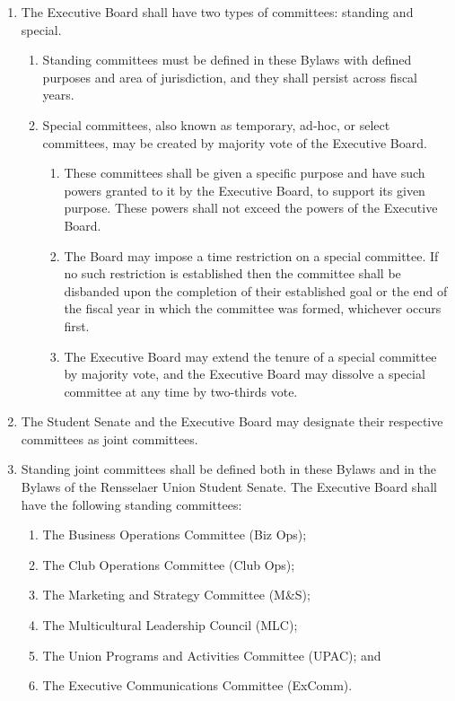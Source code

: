 \documentclass{uniondoc}
\begin{document}
\begin{enumerate}
\item The Executive Board shall have two types of committees: standing and special.
  \begin{enumerate}
  \item Standing committees must be defined in these Bylaws with defined purposes and area of jurisdiction, and they shall persist across fiscal years.
  \item Special committees, also known as temporary, ad-hoc, or select committees, may be created by majority vote of the Executive Board.
    \begin{enumerate}
    \item These committees shall be given a specific purpose and have such powers granted to it by the Executive Board, to support its given purpose. These powers shall not exceed the powers of the Executive Board.
    \item The Board may impose a time restriction on a special committee. If no such restriction is established then the committee shall be disbanded upon the completion of their established goal or the end of the fiscal year in which the committee was formed, whichever occurs first.
    \item The Executive Board may extend the tenure of a special committee by majority vote, and the Executive Board may dissolve a special committee at any time by two-thirds vote.
    \end{enumerate}
  \end{enumerate}
\item The Student Senate and the Executive Board may designate their respective committees as joint committees.
\item Standing joint committees shall be defined both in these Bylaws and in the Bylaws of the Rensselaer Union Student Senate. The Executive Board shall have the following standing committees:
  \begin{enumerate}
  \item The Business Operations Committee (Biz Ops);
  \item The Club Operations Committee (Club Ops);
  \item The Marketing and Strategy Committee (M\&S);
  \item The Multicultural Leadership Council (MLC);
  \item The Union Programs and Activities Committee (UPAC); and
  \item The Executive Communications Committee (ExComm).

\end{enumerate}
\end{enumerate}
\end{document}
